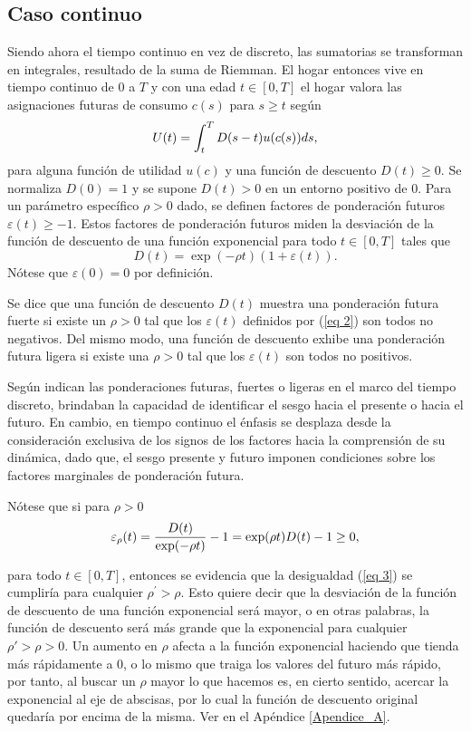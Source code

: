 \subsection{Caso continuo}
Siendo ahora el tiempo continuo en vez de discreto, las sumatorias se transforman en integrales, resultado de la suma de Riemman. El hogar entonces vive en tiempo continuo de $0$ a $T$ y con una edad $t \in [0, T]$ el hogar valora las asignaciones futuras de consumo $c(s)$ para $s \geq t$ según 
%
\begin{equation}
\label{eq 1}
  U(t)=\displaystyle \int_t^T{D(s-t)u(c(s)) ds},  
\end{equation}
%
para alguna función de utilidad $u(c)$ y una función de descuento $D(t) \geq 0$. Se normaliza $D(0) = 1$ y se supone $D(t) > 0$ en un entorno positivo de $0$. Para un parámetro específico $\rho > 0$ dado, se definen factores de ponderación futuros $\varepsilon(t) \geq -1$. Estos factores de ponderación futuros miden la desviación de la función de descuento de una función exponencial para todo $t \in [0, T]$ tales que
\begin{equation}
\label{eq 2}
    D(t) = \exp( - \rho t)(1 + \varepsilon(t)).
\end{equation}
Nótese que $\varepsilon(0) = 0$ por definición.

Se dice que una función de descuento $D(t)$ muestra una ponderación futura fuerte si existe un $\rho > 0$ tal que los $\varepsilon(t)$ definidos por (\ref{eq 2}) son todos no negativos.  Del mismo modo, una función de descuento exhibe una ponderación futura ligera si existe una $\rho > 0$ tal que los $\varepsilon(t)$ son todos no positivos. 

Según indican \parencite{feigenbaum2021deviation} las ponderaciones futuras, fuertes o ligeras en el marco del tiempo discreto, brindaban la capacidad de identificar el sesgo hacia el presente o hacia el futuro. En cambio, en tiempo continuo el énfasis se desplaza desde la consideración exclusiva de los signos de los factores hacia la comprensión de su dinámica, dado que, el sesgo presente y futuro imponen condiciones sobre los factores marginales de ponderación futura.

Nótese que si para $\rho > 0$
\begin{equation}
\label{eq 3}
    \varepsilon_{\rho}(t) = \displaystyle \dfrac{D(t)}{\exp(-\rho t)} -1 =\exp(\rho t) D(t) - 1 \geq 0,
\end{equation}

para todo $t \in [0, T]$, entonces se evidencia que la desigualdad (\ref{eq 3}) se cumpliría para cualquier $\rho^{'} > \rho$. Esto quiere decir que la desviación de la función de descuento de una función exponencial será mayor, o en otras palabras, la función de descuento será más grande que la exponencial para cualquier $\rho'>\rho>0$. Un aumento en $\rho$ afecta a la función exponencial haciendo que tienda más rápidamente a 0, o lo mismo que traiga los valores del futuro más rápido, por tanto, al buscar un $\rho$ mayor lo que hacemos es, en cierto sentido, acercar la exponencial al eje de abscisas, por lo cual la función de descuento original quedaría por encima de la misma. Ver en el Apéndice \ref{Apendice_A}. 

